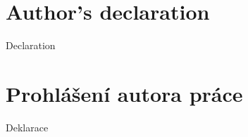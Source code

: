\mbox{}\vfill

{\let\clearpage\relax\par \chapter*{Author's declaration}}
Declaration

{\let\clearpage\relax\par \chapter*{Prohl\'a\v sen\'i autora pr\'ace}}
Deklarace
